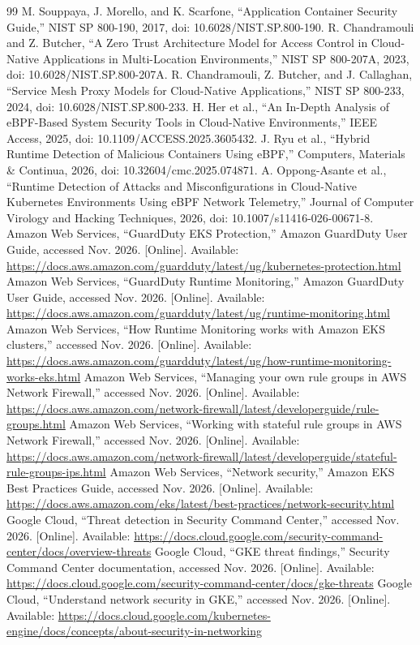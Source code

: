 \documentclass[conference]{IEEEtran}
\begin{document}
\begin{thebibliography}{99}
 M. Souppaya, J. Morello, and K. Scarfone, ``Application Container Security Guide,'' NIST SP 800-190, 2017, doi: 10.6028/NIST.SP.800-190.
 R. Chandramouli and Z. Butcher, ``A Zero Trust Architecture Model for Access Control in Cloud-Native Applications in Multi-Location Environments,'' NIST SP 800-207A, 2023, doi: 10.6028/NIST.SP.800-207A.
 R. Chandramouli, Z. Butcher, and J. Callaghan, ``Service Mesh Proxy Models for Cloud-Native Applications,'' NIST SP 800-233, 2024, doi: 10.6028/NIST.SP.800-233.
 H. Her et al., ``An In-Depth Analysis of eBPF-Based System Security Tools in Cloud-Native Environments,'' IEEE Access, 2025, doi: 10.1109/ACCESS.2025.3605432.
 J. Ryu et al., ``Hybrid Runtime Detection of Malicious Containers Using eBPF,'' Computers, Materials \& Continua, 2026, doi: 10.32604/cmc.2025.074871.
 A. Oppong-Asante et al., ``Runtime Detection of Attacks and Misconfigurations in Cloud-Native Kubernetes Environments Using eBPF Network Telemetry,'' Journal of Computer Virology and Hacking Techniques, 2026, doi: 10.1007/s11416-026-00671-8.
 Amazon Web Services, ``GuardDuty EKS Protection,'' Amazon GuardDuty User Guide, accessed Nov. 2026. [Online]. Available: \url{https://docs.aws.amazon.com/guardduty/latest/ug/kubernetes-protection.html}
 Amazon Web Services, ``GuardDuty Runtime Monitoring,'' Amazon GuardDuty User Guide, accessed Nov. 2026. [Online]. Available: \url{https://docs.aws.amazon.com/guardduty/latest/ug/runtime-monitoring.html}
 Amazon Web Services, ``How Runtime Monitoring works with Amazon EKS clusters,'' accessed Nov. 2026. [Online]. Available: \url{https://docs.aws.amazon.com/guardduty/latest/ug/how-runtime-monitoring-works-eks.html}
 Amazon Web Services, ``Managing your own rule groups in AWS Network Firewall,'' accessed Nov. 2026. [Online]. Available: \url{https://docs.aws.amazon.com/network-firewall/latest/developerguide/rule-groups.html}
 Amazon Web Services, ``Working with stateful rule groups in AWS Network Firewall,'' accessed Nov. 2026. [Online]. Available: \url{https://docs.aws.amazon.com/network-firewall/latest/developerguide/stateful-rule-groups-ips.html}
 Amazon Web Services, ``Network security,'' Amazon EKS Best Practices Guide, accessed Nov. 2026. [Online]. Available: \url{https://docs.aws.amazon.com/eks/latest/best-practices/network-security.html}
 Google Cloud, ``Threat detection in Security Command Center,'' accessed Nov. 2026. [Online]. Available: \url{https://docs.cloud.google.com/security-command-center/docs/overview-threats}
 Google Cloud, ``GKE threat findings,'' Security Command Center documentation, accessed Nov. 2026. [Online]. Available: \url{https://docs.cloud.google.com/security-command-center/docs/gke-threats}
 Google Cloud, ``Understand network security in GKE,'' accessed Nov. 2026. [Online]. Available: \url{https://docs.cloud.google.com/kubernetes-engine/docs/concepts/about-security-in-networking}
\end{thebibliography}
\end{document}
